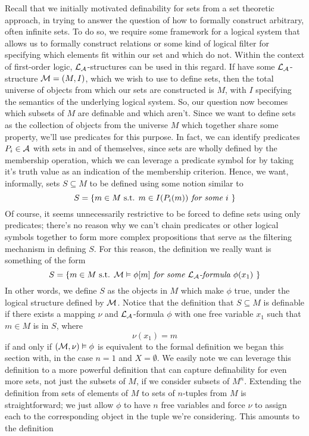 \documentclass{article}
\begin{document}
\nn
Recall that we initially motivated definability for sets from a set theoretic approach, in trying to answer the question of how to formally construct arbitrary, often infinite sets. To do so, we require some framework for a logical system that allows us to formally construct relations or some kind of logical filter for specifying which elements fit within our set and which do not. Within the context of first-order logic, $ \mathcal{L}_{\mathcal{A}} $-structures can be used in this regard. If have some $ \mathcal{L}_{\mathcal{A}} $-structure $ \mathcal{M} = (M, I) $, which we wish to use to define sets, then the total universe of objects from which our sets are constructed is $ M $, with $ I $ specifying the semantics of the underlying logical system. So, our question now becomes which subsets of $ M $ are definable and which aren't. Since we want to define sets as the collection of objects from the universe $ M $ which together share some property, we'll use predicates for this purpose. In fact, we can identify predicates $ P_i \in \mathcal{A} $ with sets in and of themselves, since sets are wholly defined by the membership operation, which we can leverage a predicate symbol for by taking it's truth value as an indication of the membership criterion. Hence, we want, informally, sets $ S \subseteq M $ to be defined using some notion similar to
    $$ S = \{ m \in M \textnormal{ s.t. } m \in I(P_i(m)) \textit{ for some $ i $ } \} $$
Of course, it seems unnecessarily restrictive to be forced to define sets using only predicates; there's no reason why we can't chain predicates or other logical symbols together to form more complex propositions that serve as the filtering mechanism in defining $ S $. For this reason, the definition we really want is something of the form
    $$ S = \{ m \in M \textnormal{ s.t. } \mathcal{M} \vDash \phi[m] \textit{ for some $ \mathcal{L}_{\mathcal{A}}$-formula $ \phi(x_1) $ } \} $$
In other words, we define $ S $ as the objects in $ M $ which make $ \phi $ true, under the logical structure defined by $ \mathcal{M} $. Notice that the definition that $ S \subseteq M $ is definable if there exists a mapping $ \nu $ and $ \mathcal{L}_{\mathcal{A}} $-formula $ \phi $ with one free variable $ x_1 $ such that $ m \in M $ is in $ S $, where
    $$ \nu(x_1) = m $$
if and only if $ (\mathcal{M}, \nu) \vDash \phi $ is equivalent to the formal definition we began this section with, in the case $ n = 1 $ and $ X = \emptyset $. We easily note we can leverage this definition to a more powerful definition that can capture definability for even more sets, not just the subsets of $ M $, if we consider subsets of $ M^n $. Extending the definition from sets of elements of $ M $ to sets of $ n $-tuples from $ M $ is straightforward; we just allow $ \phi $ to have $ n $ free variables and force $ \nu $ to assign each to the corresponding object in the tuple we're considering. This amounts to the definition
\end{document}
